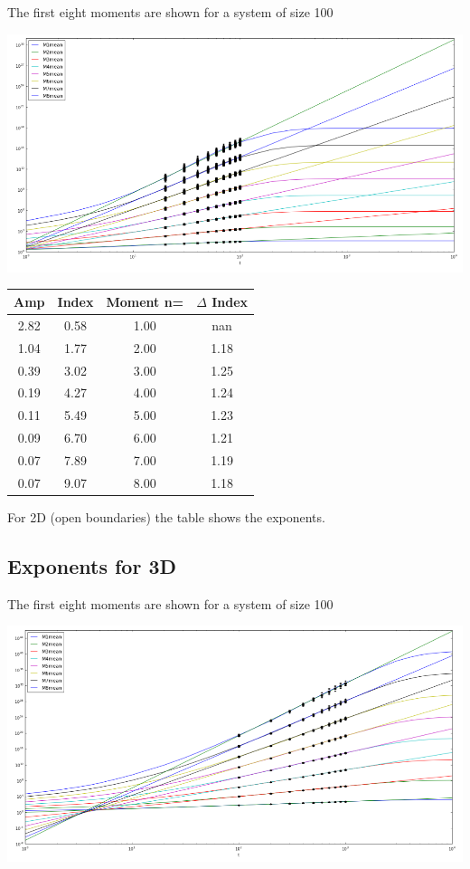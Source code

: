 \documentclass{article}
\begin{document}
\begin{multicols}{2}
The first eight moments are shown for a system of size 100

\begin{center}
	\includegraphics[scale=0.3]{sample2}
\end{center}


\begin{center}\begin{tabular}
		{|c|c|c|c|}
		\hline
		\textbf{Amp} & \textbf{Index} & \textbf{Moment n=} & \textbf{$\Delta$ Index}
		\\
		\hline
		2.82 & 0.58 & 1.00 & nan
		\\
		1.04 & 1.77 & 2.00 & 1.18
		\\
		0.39 & 3.02 & 3.00 & 1.25
		\\
		0.19 & 4.27 & 4.00 & 1.24
		\\
		0.11 & 5.49 & 5.00 & 1.23
		\\
		0.09 & 6.70 & 6.00 & 1.21
		\\
		0.07 & 7.89 & 7.00 & 1.19
		\\
		0.07 & 9.07 & 8.00 & 1.18
		\\
		\hline
	\end{tabular}\end{center}
	
	For 2D (open boundaries) the table shows the exponents. 

\subsection{Exponents for 3D}

The first eight moments are shown for a system of size 100

\begin{center}
	\includegraphics[scale=0.3]{3d_sample}
\end{center}


\end{multicols}
\end{document}
